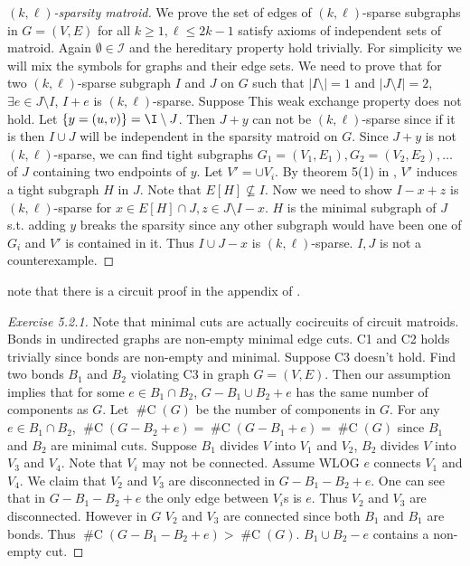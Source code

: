 \documentclass[12pt]{article}
\newcommand{\klsparse}{$(k,\ell)$-sparse}
\DeclareMathOperator{\ncp}{\#C} %
\begin{document}
\begin{proof}[$(k,\ell)$-sparsity matroid]
We prove the set of edges of $(k,\ell)$-sparse subgraphs in $G=(V,E)$ for all $k\geq 1, \ell \leq 2k-1$ satisfy axioms of independent sets of matroid. Again $\emptyset \in \mathcal I$ and the hereditary property hold trivially. For simplicity we will mix the symbols for graphs and their edge sets. We need to prove that for two \klsparse{} subgraph $I$ and $J$ on $G$ such that $|I\setminus|=1$ and $|J\setminus I|=2$, $\exists e\in J\setminus I$, $I+e$ is \klsparse{}. Suppose This weak exchange property does not hold. Let $\{y=(u,v)\}=\I\setminus J$. Then $J+y$ can not be \klsparse{} since if it is then $I\cup J$ will be independent in the sparsity matroid on $G$. Since $J+y$ is not \klsparse{}, we can find tight subgraphs $G_1=(V_1,E_1),G_2=(V_2,E_2),\ldots$ of $J$ containing two endpoints of $y$. Let $V'=\cup V_i$. By theorem 5(1) in \cite{lee_pebble_2008}, $V'$ induces a tight subgraph $H$ in $J$. Note that $E[H]\not \subseteq I$. Now we need to show $I-x+z$ is \klsparse{} for $x\in E[H]\cap J,z\in J\setminus I-x$. $H$ is the minimal subgraph of $J$ s.t. adding $y$ breaks the sparsity since any other subgraph would have been one of $G_i$ and $V'$ is contained in it. Thus $I\cup J-x$ is \klsparse{}. $I, J$ is not a counterexample.
\end{proof}

note that there is a circuit proof in the appendix of \cite{Whiteley_matroids_1996}.

\begin{proof}[Exercise 5.2.1]
    Note that minimal cuts are actually cocircuits of circuit matroids.
    Bonds in undirected graphs are non-empty minimal edge cuts. C1 and C2 holds trivially since bonds are non-empty and minimal. Suppose C3 doesn't hold. Find two bonds $B_1$ and $B_2$ violating C3 in graph $G=(V,E)$. Then our assumption implies that for some $e\in B_1\cap B_2$, $G-B_1\cup B_2 + e$ has the same number of components as $G$. Let $\ncp(G)$ be the number of components in $G$. For any $e\in B_1\cap B_2$, $\ncp(G-B_2+e)=\ncp(G-B_1+e)=\ncp(G)$ since $B_1$ and $B_2$ are minimal cuts. Suppose $B_1$ divides $V$ into $V_1$ and $V_2$, $B_2$ divides $V$ into $V_3$ and $V_4$. Note that $V_i$ may not be connected. Assume WLOG $e$ connects $V_1$ and $V_4$. We claim that $V_2$ and $V_3$ are disconnected in $G-B_1-B_2+e$. One can see that in $G-B_1-B_2+e$ the only edge between $V_i$s is $e$. Thus $V_2$ and $V_3$ are disconnected. However in $G$ $V_2$ and $V_3$ are connected since both $B_1$ and $B_1$ are bonds. Thus $\ncp(G-B_1-B_2+e)> \ncp(G)$. $B_1\cup B_2-e$ contains a non-empty cut.
\end{proof}
\end{document}
